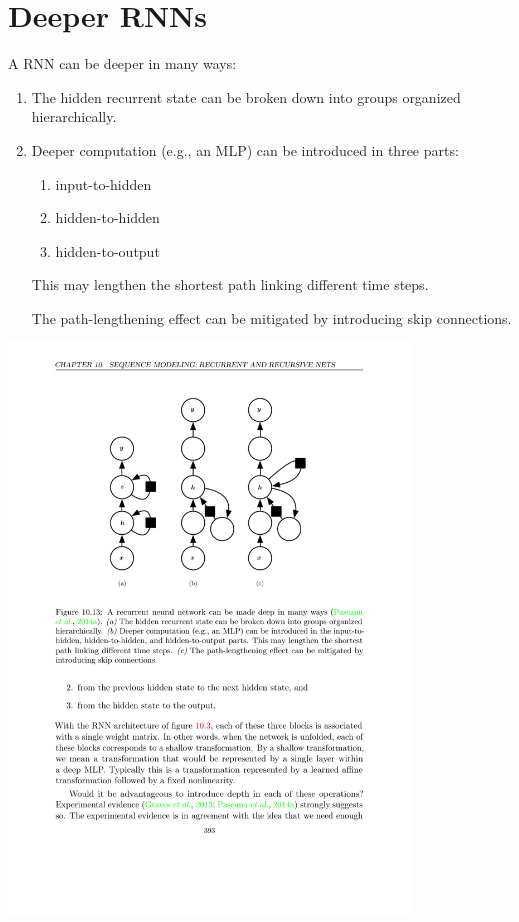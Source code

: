 \documentclass[12pt, a4paper]{article}
\begin{document}
\section{Deeper RNNs}
A RNN can be deeper in many ways:
\begin{enumerate}
    \item The hidden recurrent state can be broken down into groups organized hierarchically.
    \item{
        Deeper computation (e.g., an MLP) can be introduced in three parts:
        \begin{enumerate}
            \item input-to-hidden
            \item hidden-to-hidden
            \item hidden-to-output
        \end{enumerate}
        This may lengthen the shortest path linking different time steps.
    }
    The path-lengthening effect can be mitigated by introducing skip connections.
\end{enumerate}
\begin{center}
    \includegraphics[width=0.8\textwidth]{../imgs/Deeper_RNNs.pdf}
\end{center}
\end{document}
